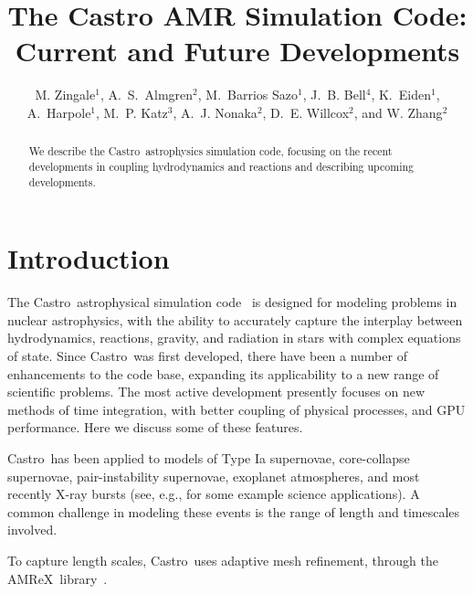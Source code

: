 \documentclass[a4paper]{jpconf}
\newcommand{\castro}{{\sffamily Castro}}
\newcommand{\amrex}{{\sffamily AMReX}}
\begin{document}
\title{The Castro AMR Simulation Code: Current and Future Developments}

\author{M. Zingale$^1$,
        A.~S.~Almgren$^2$,
        M.~Barrios Sazo$^1$,
        J.~B. Bell$^4$,
        K.~Eiden$^1$,
        A.~Harpole$^1$,
        M.~P. Katz$^3$,
        A.~J. Nonaka$^2$,
        D.~E. Willcox$^2$, and
        W. Zhang$^2$}

\address{$^1$Department of Physics and Astronomy, Stony Brook
  University, Stony Brook, NY 11794-3800 USA}

\address{$^2$Center for Computational Sciences and Engineering,
  Lawrence Berkeley National Lab, Berkeley, CA 94720 USA}

\address{$^3$NVIDIA Corporation, 2788 San Tomas Expressway,
  Santa Clara, CA, 95050 USA}


\begin{abstract}
We describe the \castro\ astrophysics simulation code, focusing on the
recent developments in coupling hydrodynamics and reactions and describing
upcoming developments.
\end{abstract}



\section{Introduction}

The \castro\ astrophysical simulation code~\cite{castro} is designed
for modeling problems in nuclear astrophysics, with the ability to
accurately capture the interplay between hydrodynamics, reactions,
gravity, and radiation in stars with complex equations of state.
Since \castro\ was first developed, there have been a number of
enhancements to the code base, expanding its applicability to a new
range of scientific problems.  The most active development presently
focuses on new methods of time integration, with better coupling of
physical processes, and GPU performance.  Here we discuss some of
these features.

\castro\ has been applied to models of Type Ia supernovae,
core-collapse supernovae, pair-instability supernovae, exoplanet
atmospheres, and most recently X-ray bursts (see, e.g.,
\cite{castro-ccsne,castro-pairinstability,polin:2019,wdmergerI} for
some example science applications).  A common challenge in modeling
these events is the range of length and timescales involved.

To capture length scales, \castro\ uses adaptive mesh refinement,
through the \amrex\ library~\cite{amrex_joss}.
\end{document}

